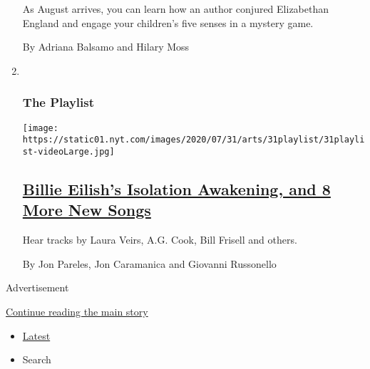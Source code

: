 \begin{enumerate}
  As August arrives, you can learn how an author conjured Elizabethan
  England and engage your children's five senses in a mystery game.

  By Adriana Balsamo and Hilary Moss
\item ~
  \hypertarget{the-playlist}{%
  \subsubsection{The Playlist}\label{the-playlist}}

  \texttt{[image: https://static01.nyt.com/images/2020/07/31/arts/31playlist/31playlist-videoLarge.jpg]}

  \hypertarget{billie-eilishs-isolation-awakening-and-8-more-new-songs}{%
  \subsection{\texorpdfstring{\href{/2020/07/31/arts/music/playlist-billie-eilish-snakehips-a-boogie.html}{Billie
  Eilish's Isolation Awakening, and 8 More New
  Songs}}{Billie Eilish's Isolation Awakening, and 8 More New Songs}}\label{billie-eilishs-isolation-awakening-and-8-more-new-songs}}

  Hear tracks by Laura Veirs, A.G. Cook, Bill Frisell and others.

  By Jon Pareles, Jon Caramanica and Giovanni Russonello
\end{enumerate}

Advertisement

\protect\hyperlink{after-mid1}{Continue reading the main story}

\begin{itemize}
\tightlist
\item
  \protect\hyperlink{stream-panel}{Latest}
\item
  Search
\end{itemize}

